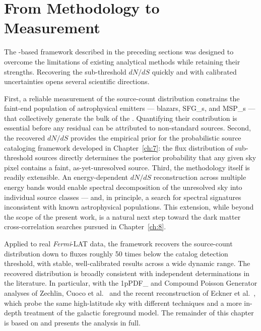 \section{From Methodology to Measurement}
\label{sec:transition_dnds}

The \CNN-based framework described in the preceding sections was designed to overcome the limitations of existing analytical methods while retaining their strengths.
Recovering the sub-threshold $dN/dS$ quickly and with calibrated uncertainties opens several scientific directions.

First, a reliable measurement of the source-count distribution constrains the faint-end population of astrophysical emitters --- blazars, \glspl{SFG_}, and \glspl{MSP_} --- that collectively generate the bulk of the \UGRB.
Quantifying their contribution is essential before any residual can be attributed to non-standard sources.
Second, the recovered $dN/dS$ provides the empirical prior for the probabilistic source cataloging framework developed in Chapter~\ref{ch:7}: the flux distribution of sub-threshold sources directly determines the posterior probability that any given sky pixel contains a faint, as-yet-unresolved source.
Third, the methodology itself is readily extensible.
An energy-dependent $dN/dS$ reconstruction across multiple energy bands would enable spectral decomposition of the unresolved sky into individual source classes --- and, in principle, a search for spectral signatures inconsistent with known astrophysical populations.
This extension, while beyond the scope of the present work, is a natural next step toward the dark matter cross-correlation searches pursued in Chapter~\ref{ch:8}.

Applied to real \textit{Fermi}-LAT data, the framework recovers the source-count distribution down to fluxes roughly 50 times below the catalog detection threshold, with stable, well-calibrated results across a wide dynamic range.
The recovered distribution is broadly consistent with independent determinations in the literature. In particular, with the \gls{1pPDF_} and Compound Poisson Generator analyses of Zechlin, Cuoco et al.~\cite{Cuoco-1pdf} and the recent \SBI reconstruction of Eckner et al.~\cite{Eckner:2025waa}, which probe the same high-latitude sky with different \SBI techniques and a more in-depth treatment of the galactic foreground model.
The remainder of this chapter is based on \cite{Amerio:2023uet} and presents the analysis in full.
